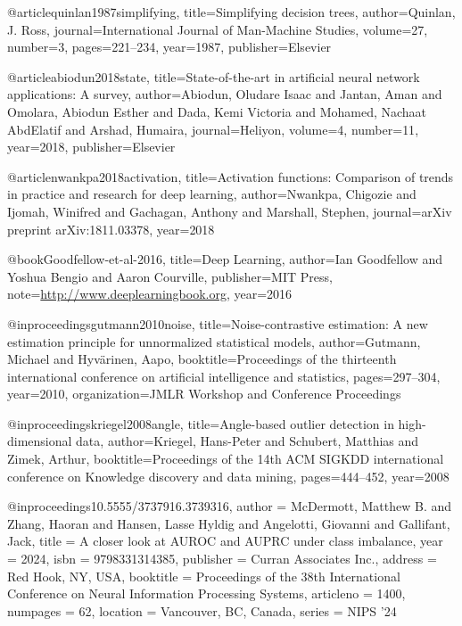 @article{quinlan1987simplifying,
  title={Simplifying decision trees},
  author={Quinlan, J. Ross},
  journal={International Journal of Man-Machine Studies},
  volume={27},
  number={3},
  pages={221--234},
  year={1987},
  publisher={Elsevier}
}

@article{abiodun2018state,
  title={State-of-the-art in artificial neural network applications: A survey},
  author={Abiodun, Oludare Isaac and Jantan, Aman and Omolara, Abiodun Esther and Dada, Kemi Victoria and Mohamed, Nachaat AbdElatif and Arshad, Humaira},
  journal={Heliyon},
  volume={4},
  number={11},
  year={2018},
  publisher={Elsevier}
}

@article{nwankpa2018activation,
  title={Activation functions: Comparison of trends in practice and research for deep learning},
  author={Nwankpa, Chigozie and Ijomah, Winifred and Gachagan, Anthony and Marshall, Stephen},
  journal={arXiv preprint arXiv:1811.03378},
  year={2018}
}

@book{Goodfellow-et-al-2016,
    title={Deep Learning},
    author={Ian Goodfellow and Yoshua Bengio and Aaron Courville},
    publisher={MIT Press},
    note={\url{http://www.deeplearningbook.org}},
    year={2016}
}

@inproceedings{gutmann2010noise,
  title={Noise-contrastive estimation: A new estimation principle for unnormalized statistical models},
  author={Gutmann, Michael and Hyvärinen, Aapo},
  booktitle={Proceedings of the thirteenth international conference on artificial intelligence and statistics},
  pages={297--304},
  year={2010},
  organization={JMLR Workshop and Conference Proceedings}
}

@inproceedings{kriegel2008angle,
  title={Angle-based outlier detection in high-dimensional data},
  author={Kriegel, Hans-Peter and Schubert, Matthias and Zimek, Arthur},
  booktitle={Proceedings of the 14th ACM SIGKDD international conference on Knowledge discovery and data mining},
  pages={444--452},
  year={2008}
}

@inproceedings{10.5555/3737916.3739316,
  author = {McDermott, Matthew B. and Zhang, Haoran and Hansen, Lasse Hyldig and Angelotti, Giovanni and Gallifant, Jack},
  title = {A closer look at {AUROC} and {AUPRC} under class imbalance},
  year = {2024},
  isbn = {9798331314385},
  publisher = {Curran Associates Inc.},
  address = {Red Hook, NY, USA},
  booktitle = {Proceedings of the 38th International Conference on Neural Information Processing Systems},
  articleno = {1400},
  numpages = {62},
  location = {Vancouver, BC, Canada},
  series = {NIPS '24}
}

